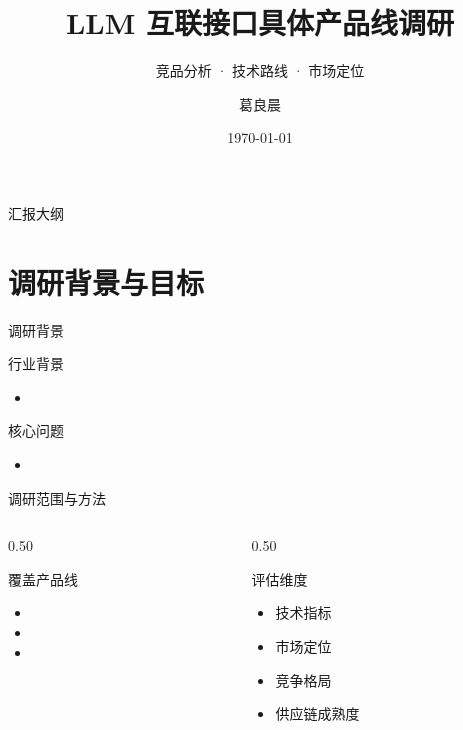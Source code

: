 \documentclass[aspectratio=169, 10pt, UTF8]{ctexbeamer}
\title[LLM 互联接口产品线调研]{LLM 互联接口具体产品线调研}
\subtitle{竞品分析 · 技术路线 · 市场定位}
\author[葛良晨]{葛良晨}
\institute[]{}
\date{\today}
\begin{document}
\begin{frame}
  \titlepage
\end{frame}

\begin{frame}{汇报大纲}
  \tableofcontents
\end{frame}

\section{调研背景与目标}

\begin{frame}{调研背景}
  \begin{block}{行业背景}
    \begin{itemize}
      \item
    \end{itemize}
  \end{block}

  \begin{alertblock}{核心问题}
    \begin{itemize}
      \item
    \end{itemize}
  \end{alertblock}
\end{frame}

\begin{frame}{调研范围与方法}
  \begin{columns}[T]
    \begin{column}{0.50\textwidth}
      \begin{block}{覆盖产品线}
        \begin{itemize}
          \item
          \item
          \item
        \end{itemize}
      \end{block}
    \end{column}
    \begin{column}{0.50\textwidth}
      \begin{exampleblock}{评估维度}
        \begin{itemize}
          \item 技术指标
          \item 市场定位
          \item 竞争格局
          \item 供应链成熟度
        \end{itemize}
      \end{exampleblock}
    \end{column}
  \end{columns}
\end{frame}
\end{document}
